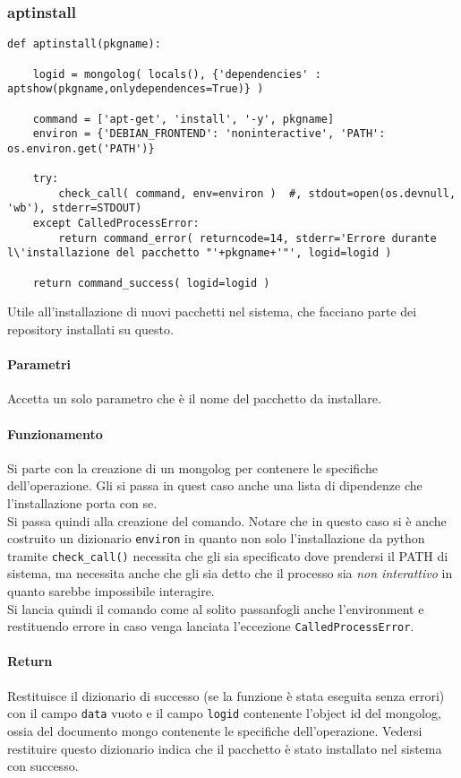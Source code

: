 \documentclass[11pt]{article}
\begin{document}
\subsubsection{aptinstall}\label{aptinstall}
\begin{lstlisting}
def aptinstall(pkgname):
    
    logid = mongolog( locals(), {'dependencies' : aptshow(pkgname,onlydependences=True)} )

    command = ['apt-get', 'install', '-y', pkgname]
    environ = {'DEBIAN_FRONTEND': 'noninteractive', 'PATH': os.environ.get('PATH')}

    try:
        check_call( command, env=environ )  #, stdout=open(os.devnull, 'wb'), stderr=STDOUT)
    except CalledProcessError:
        return command_error( returncode=14, stderr='Errore durante l\'installazione del pacchetto "'+pkgname+'"', logid=logid )

    return command_success( logid=logid )
\end{lstlisting}
Utile all'installazione di nuovi pacchetti nel sistema, che facciano parte dei repository installati su questo.
\paragraph{Parametri}
Accetta un solo parametro che è il nome del pacchetto da installare.
\paragraph{Funzionamento}
Si parte con la creazione di un mongolog per contenere le specifiche dell'operazione. Gli si passa in quest caso
anche una lista di dipendenze che l'installazione porta con se.\\
Si passa quindi alla creazione del comando. Notare che in questo caso si è anche costruito un dizionario \texttt{environ}
in quanto non solo l'installazione da python tramite \texttt{check\_call()} necessita che gli sia specificato dove
prendersi il PATH di sistema, ma necessita anche che gli sia detto che il processo sia \textit{non interattivo} in quanto
sarebbe impossibile interagire.\\
Si lancia quindi il comando come al solito passanfogli anche l'environment e restituendo errore in caso venga lanciata
l'eccezione \texttt{CalledProcessError}.
\paragraph{Return}
Restituisce il dizionario di successo (se la funzione è stata eseguita senza errori) con il campo \texttt{data} vuoto
e il campo \texttt{logid} contenente l'object id del mongolog, ossia del documento mongo contenente le specifiche
dell'operazione. Vedersi restituire questo dizionario indica che il pacchetto è stato installato nel sistema
con successo.
\end{document}
